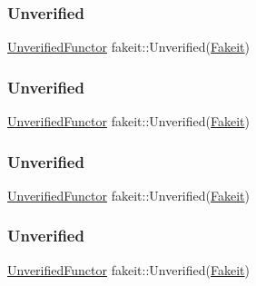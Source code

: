 \subsubsection{\texorpdfstring{Unverified}{Unverified}\hspace{0.1cm}{\footnotesize\ttfamily [4/9]}}
{\footnotesize\ttfamily \mbox{\hyperlink{classfakeit_1_1UnverifiedFunctor}{Unverified\+Functor}} fakeit\+::\+Unverified(\mbox{\hyperlink{single__header_2tpunit_2fakeit_8hpp_a2b1f324059bec9d07841630bd5c2e7bc}{Fakeit}})\hspace{0.3cm}{\ttfamily [static]}}

\mbox{\label{namespacefakeit_aeaed1b328c76d8460e403a1a0d22eb96}} 
\subsubsection{\texorpdfstring{Unverified}{Unverified}\hspace{0.1cm}{\footnotesize\ttfamily [5/9]}}
{\footnotesize\ttfamily \mbox{\hyperlink{classfakeit_1_1UnverifiedFunctor}{Unverified\+Functor}} fakeit\+::\+Unverified(\mbox{\hyperlink{single__header_2tpunit_2fakeit_8hpp_a2b1f324059bec9d07841630bd5c2e7bc}{Fakeit}})\hspace{0.3cm}{\ttfamily [static]}}

\mbox{\label{namespacefakeit_aeaed1b328c76d8460e403a1a0d22eb96}} 
\subsubsection{\texorpdfstring{Unverified}{Unverified}\hspace{0.1cm}{\footnotesize\ttfamily [6/9]}}
{\footnotesize\ttfamily \mbox{\hyperlink{classfakeit_1_1UnverifiedFunctor}{Unverified\+Functor}} fakeit\+::\+Unverified(\mbox{\hyperlink{single__header_2tpunit_2fakeit_8hpp_a2b1f324059bec9d07841630bd5c2e7bc}{Fakeit}})\hspace{0.3cm}{\ttfamily [static]}}

\mbox{\label{namespacefakeit_aeaed1b328c76d8460e403a1a0d22eb96}} 
\subsubsection{\texorpdfstring{Unverified}{Unverified}\hspace{0.1cm}{\footnotesize\ttfamily [7/9]}}
{\footnotesize\ttfamily \mbox{\hyperlink{classfakeit_1_1UnverifiedFunctor}{Unverified\+Functor}} fakeit\+::\+Unverified(\mbox{\hyperlink{single__header_2tpunit_2fakeit_8hpp_a2b1f324059bec9d07841630bd5c2e7bc}{Fakeit}})\hspace{0.3cm}{\ttfamily [static]}}

